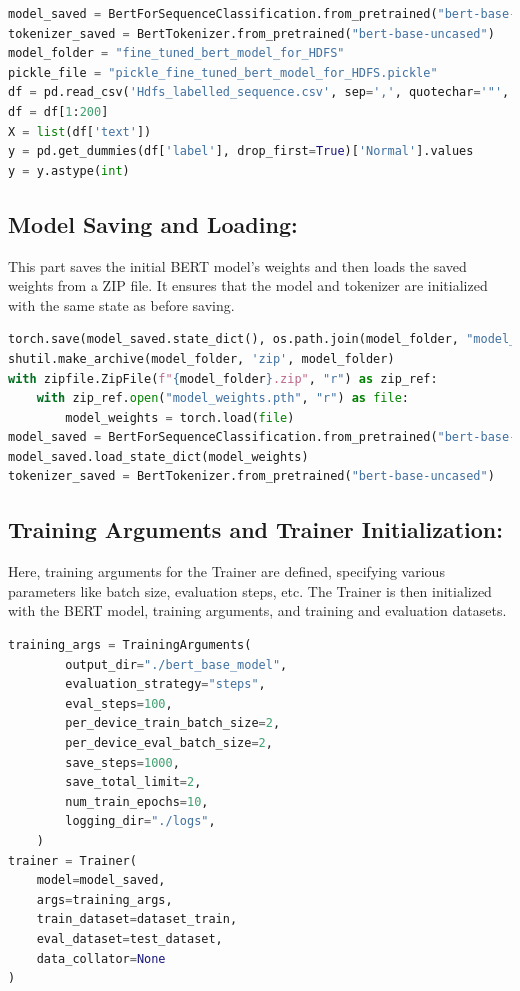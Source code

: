 \documentclass{article}
\begin{document}
\begin{lstlisting}[language=Python]
model_saved = BertForSequenceClassification.from_pretrained("bert-base-uncased")
tokenizer_saved = BertTokenizer.from_pretrained("bert-base-uncased")
model_folder = "fine_tuned_bert_model_for_HDFS"
pickle_file = "pickle_fine_tuned_bert_model_for_HDFS.pickle"
df = pd.read_csv('Hdfs_labelled_sequence.csv', sep=',', quotechar='"', names=["text", "label"])
df = df[1:200]
X = list(df['text'])
y = pd.get_dummies(df['label'], drop_first=True)['Normal'].values
y = y.astype(int)
\end{lstlisting}

\subsection{Model Saving and Loading:}
This part saves the initial BERT model's weights and then loads the saved weights from a ZIP file. It ensures that the model and tokenizer are initialized with the same state as before saving.

\begin{lstlisting}[language=Python]
torch.save(model_saved.state_dict(), os.path.join(model_folder, "model_weights.pth"))
shutil.make_archive(model_folder, 'zip', model_folder)
with zipfile.ZipFile(f"{model_folder}.zip", "r") as zip_ref:
    with zip_ref.open("model_weights.pth", "r") as file:
        model_weights = torch.load(file)
model_saved = BertForSequenceClassification.from_pretrained("bert-base-uncased")
model_saved.load_state_dict(model_weights)
tokenizer_saved = BertTokenizer.from_pretrained("bert-base-uncased")
\end{lstlisting}

\subsection{Training Arguments and Trainer Initialization:}
Here, training arguments for the Trainer are defined, specifying various parameters like batch size, evaluation steps, etc. The Trainer is then initialized with the BERT model, training arguments, and training and evaluation datasets.

\begin{lstlisting}[language=Python]
training_args = TrainingArguments(
        output_dir="./bert_base_model",
        evaluation_strategy="steps",
        eval_steps=100,
        per_device_train_batch_size=2,
        per_device_eval_batch_size=2,
        save_steps=1000,
        save_total_limit=2,
        num_train_epochs=10,
        logging_dir="./logs",
    )
trainer = Trainer(
    model=model_saved,
    args=training_args,
    train_dataset=dataset_train,
    eval_dataset=test_dataset,
    data_collator=None
)
\end{lstlisting}
\end{document}
